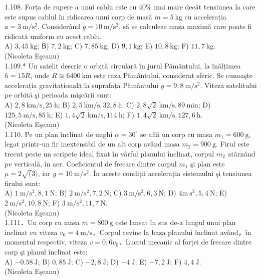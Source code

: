 1.108. Forța de rupere a unui cablu este cu $40 \%$ mai mare decât tensiunea la care este supus cablul în ridicarea unui corp de masă $m=5 \mathrm{~kg}$ cu accelerația $a=3 \mathrm{~m} / \mathrm{s}^{2}$. Considerând $g=10 \mathrm{~m} / \mathrm{s}^{2}$, să se calculeze masa maximă care poate fi ridicată uniform cu acest cablu.\\ A) $3,45 \mathrm{~kg}$; В) $7,2 \mathrm{~kg}$; C) $7,85 \mathrm{~kg}$; D) $9,1 \mathrm{~kg}$; E) $10,8 \mathrm{~kg}$; F) $11,7 \mathrm{~kg}$.\\ (Nicoleta Eşeanu)\\

1.109.* Un satelit descrie o orbită circulară în jurul Pământului, la înălțimea $h=15 R$, unde $R \cong 6400 \mathrm{~km}$ este raza Pământului, considerat sferic. Se cunoaşte accelerația gravitațională la suprafața Pământului $g=9,8 \mathrm{~m} / \mathrm{s}^{2}$. Viteza satelitului pe orbită şi perioada mişcării sunt:\\ A) $2,8 \mathrm{~km} / \mathrm{s}, 25 \mathrm{~h}$; B) $2,5 \mathrm{~km} / \mathrm{s}, 32,8 \mathrm{~h}$; C) $2,8 \sqrt{2} \mathrm{~km} / \mathrm{s}, 89 \mathrm{~min}$; D) $125,5 \mathrm{~m} / \mathrm{s}, 85 \mathrm{~h}$; E) $1,4 \sqrt{2} \mathrm{~km} / \mathrm{s}, 114 \mathrm{~h}$; F) $1,4 \sqrt{2} \mathrm{~km} / \mathrm{s}, 127,6 \mathrm{~h}$.\\ (Nicoleta Eşeanu)\\

1.110. Pe un plan înclinat de unghi $\alpha=30^{\circ}$ se află un corp cu masa $m_{1}=600 \mathrm{~g}$, legat printr-un fir inextensibil de un alt corp având masa $m_{2}=900 \mathrm{~g}$. Firul este trecut peste un scripete ideal fixat în vârful planului înclinat, corpul $m_{2}$ atârnând pe verticală, în aer. Coeficientul de frecare dintre corpul $m_{1}$ şi plan este $\mu=2 \sqrt(3)$, iar $g=10 \mathrm{~m} / \mathrm{s}^{2}$. În aceste condiții accelerația sistemului şi tensiunea firului sunt:\\ A) $1 \mathrm{~m} / \mathrm{s}^{2}, 8,1 \mathrm{~N}$; B) $2 \mathrm{~m} / \mathrm{s}^{2}, 7,2 \mathrm{~N}$; C) $3 \mathrm{~m} / \mathrm{s}^{2}, 6,3 \mathrm{~N}$; D) $4 \mathrm{m} \mathrm{~s}^{2}, 5,4 \mathrm{~N}$; E) $2 \mathrm{~m} / \mathrm{s}^{2}, 10,8 \mathrm{~N}$; F) $3 \mathrm{~m} / \mathrm{s}^{2}, 11,7 \mathrm{~N}$. \\ (Nicoleta Eşeanu)\\

1.111．Un corp cu masa $m=800 \mathrm{~g}$ este lansat în sus de-a lungul unui plan înclinat cu viteza $v_{0}=4 \mathrm{~m} / \mathrm{s}$．Corpul revine la baza planului înclinat având，în momentul respectiv, viteza $v=0,6 v_{0}$．Lucrul mecanic al forței de frecare dintre corp şi planul înclinat este:\\ A) $-0.58 \mathrm{~J}$; B) $0,85 \mathrm{~J}$; C) $-2,8 \mathrm{~J}$; D) $-4 \mathrm{~J}$; E) $-7,2 \mathrm{~J}$; F) $4,4 \mathrm{~J}$.\\ (Nicoleta Eşeanu)\\

